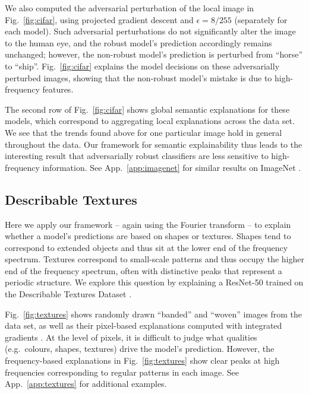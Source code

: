 \documentclass{article}
\DeclareRobustCommand{\App}[1]{App.~\ref{app:#1}}
\DeclareRobustCommand{\Fig}[1]{Fig.~\ref{fig:#1}}
\begin{document}
We also computed the adversarial perturbation of the local image in \Fig{cifar}, using projected gradient descent \citep{NoceWrig06} and $\epsilon = 8/255$ (separately for each model). Such adversarial perturbations do not significantly alter the image to the human eye, and the robust model's prediction accordingly remains unchanged; however, the non-robust model's prediction is perturbed from ``horse'' to ``ship''. \Fig{cifar} explains the model decisions on these adversarially perturbed images, showing that the non-robust model's mistake is due to high-frequency features.

The second row of \Fig{cifar} shows global semantic explanations for these models, which correspond to aggregating local explanations across the data set. We see that the trends found above for one particular image hold in general throughout the data. Our framework for semantic explainability thus leads to the interesting result that adversarially robust classifiers are less sensitive to high-frequency information. See \App{imagenet} for similar results on ImageNet \citep{imagenet09}. 


\subsection{Describable Textures}
\label{sec:textures}


Here we apply our framework -- again using the Fourier transform -- to explain whether a model's predictions are based on shapes or textures. Shapes tend to correspond to extended objects and thus sit at the lower end of the frequency spectrum. Textures correspond to small-scale patterns and thus occupy the higher end of the frequency spectrum, often with distinctive peaks that represent a periodic structure. We explore this question by explaining a ResNet-50 \citep{resnet} trained on the Describable Textures Dataset \citep{describablestextures}. 

\Fig{textures} shows randomly drawn ``banded'' and ``woven'' images from the data set, as well as their pixel-based explanations computed with integrated gradients \citep{IntegratedGradients}. At the level of pixels, it is difficult to judge what qualities (e.g.~colours, shapes, textures) drive the model's prediction. However, the frequency-based explanations in \Fig{textures} show clear peaks at high frequencies corresponding to regular patterns in each image. See \App{textures} for additional examples. 
\end{document}

